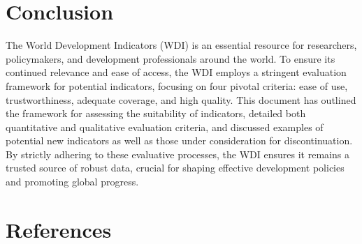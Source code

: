 \documentclass[
  11pt,
  a4paper,
  DIV=11,
  numbers=noendperiod]{scrreprt}
\begin{document}

\chapter{Conclusion}\label{conclusion}

The World Development Indicators (WDI) is an essential resource for
researchers, policymakers, and development professionals around the
world. To ensure its continued relevance and ease of access, the WDI
employs a stringent evaluation framework for potential indicators,
focusing on four pivotal criteria: ease of use, trustworthiness,
adequate coverage, and high quality. This document has outlined the
framework for assessing the suitability of indicators, detailed both
quantitative and qualitative evaluation criteria, and discussed examples
of potential new indicators as well as those under consideration for
discontinuation. By strictly adhering to these evaluative processes, the
WDI ensures it remains a trusted source of robust data, crucial for
shaping effective development policies and promoting global progress.


\chapter*{References}\label{references}

\end{document}
